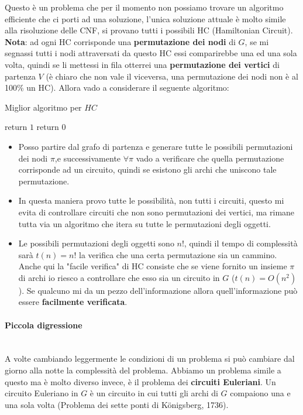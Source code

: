 \documentclass{article}
\begin{document}
Questo è un problema che per il momento non possiamo trovare un algoritmo efficiente
che ci porti ad una soluzione, l'unica soluzione attuale è molto simile alla risoluzione
delle CNF, si provano tutti i possibili HC (Hamiltonian Circuit).
\newline\newline
\textbf{Nota}: ad ogni HC corrisponde una \textbf{permutazione dei nodi} di $G$, se mi segnassi tutti i nodi
attraversati da questo HC essi comparirebbe una ed una sola volta, quindi se li mettessi
in fila otterrei una \textbf{permutazione dei vertici} di partenza $V$ (è chiaro
che non vale il viceversa, una permutazione dei nodi non è al 100\% un HC). Allora
vado a considerare il seguente algoritmo:
\begin{algorithm}[hbt!]
    \caption{Miglior algoritmo per $HC$}\label{alg:hc}
    {
        {
            return $1$\;
        }
    }
    return $0$\;
\end{algorithm}
\begin{itemize}
    \item Posso partire dal grafo di partenza e generare tutte le possibili permutazioni dei nodi
    $\pi$,e successivamente $\forall\pi$ vado a verificare che quella permutazione corrisponde ad un circuito,
    quindi se esistono gli archi che uniscono tale permutazione.

    \item In questa maniera provo tutte le possibilità, non tutti i circuiti, questo mi evita di controllare
    circuiti che non sono permutazioni dei vertici, ma rimane tutta via un algoritmo che itera
    su tutte le permutazioni degli oggetti.

    \item Le possibili permutazioni degli oggetti sono $n!$,
    quindi il tempo di complessità sarà $t(n)=n!$ la verifica che una certa permutazione sia un
    cammino. Anche qui la "facile verifica" di HC consiste che se viene fornito un insieme $\pi$
    di archi io riesco a controllare che esso sia un circuito in $G$ ($t(n)=O(n^2)$). Se qualcuno mi da
    un pezzo dell'informazione allora quell'informazione può essere \textbf{facilmente verificata}.
\end{itemize}


\paragraph{Piccola digressione}\mbox{}\\
A volte cambiando leggermente le condizioni di un problema si può cambiare dal giorno
alla notte la complessità del problema. Abbiamo un problema simile a questo ma è
molto diverso invece, è il problema dei \textbf{circuiti Euleriani}.
Un circuito Euleriano in $G$ è un circuito in cui tutti gli archi di $G$ compaiono una e una
sola volta (Problema dei sette ponti di Königsberg, 1736).
\end{document}
